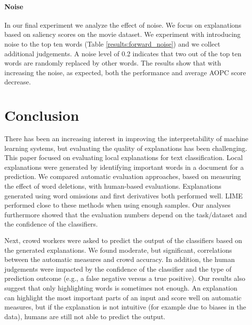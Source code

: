 \documentclass[11pt,a4paper]{article}
\begin{document}

 
\paragraph*{Noise}
In our final experiment we analyze the effect of noise. We focus on explanations based on saliency scores on the movie dataset. We experiment with introducing noise to the top ten words (Table \ref{results:forward_noise}) and we collect additional judgements. A noise level of 0.2 indicates that two out of the top ten words are randomly replaced by other words. The results show that with increasing the noise, as expected, both the performance and average AOPC score decrease. 

\newpage
\section{Conclusion}
There has been  an increasing interest in improving the interpretability of machine learning systems, but evaluating the quality of explanations has been challenging. 
This paper focused on evaluating local explanations for text classification.  Local explanations were generated  by identifying important words in a document for a prediction. 
We compared  automatic evaluation approaches, based on measuring the effect of word deletions,  with human-based evaluations.  Explanations generated using word omissions and first derivatives both  performed well. LIME \cite{Ribeiro:2016:WIT:2939672.2939778}  performed close to these methods when using enough samples. 
 Our analyses furthermore showed that the evaluation numbers depend on the task/dataset and the confidence of the classifiers.

Next, crowd workers were asked to predict the output of the classifiers based on the generated explanations. 
We found moderate, but significant, correlations between the automatic measures and crowd accuracy. In addition, the human judgements were impacted by the confidence of the classifier and the type of prediction outcome (e.g., a false negative versus a true positive). 
Our results also suggest that only highlighting words is sometimes not enough. An explanation can 
highlight the most important parts of an input
and score well on automatic measures, but if the explanation is not intuitive (for example due to biases in the data), humans are still not able to predict the output. 
\end{document}
